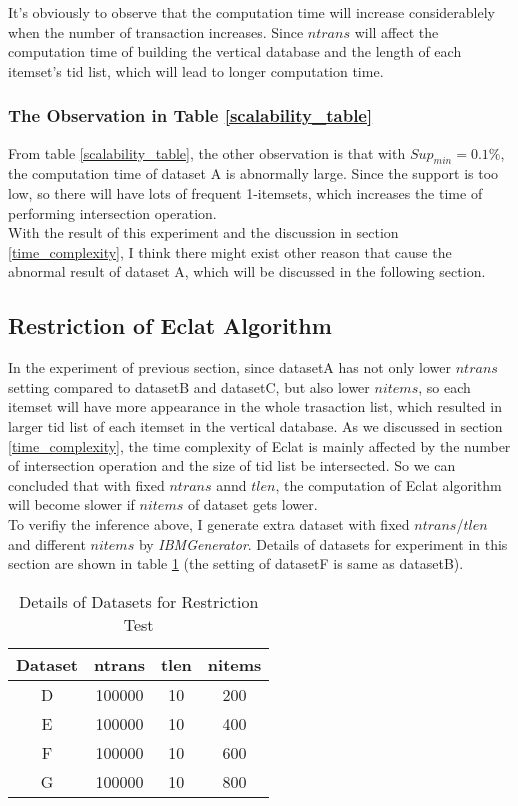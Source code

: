 \documentclass[a4paper, oneside, final, 12pt]{scrartcl} %
\begin{document}
It's obviously to observe that the computation time will increase considerablely
when the number of transaction increases. Since $ntrans$ will affect the computation time
of building the vertical database and the length of each itemset's tid list, which will lead to
longer computation time. \\

\subsubsection{The Observation in Table \ref{scalability_table}}
From table \ref{scalability_table}, the other observation is that with $Sup_{min} = 0.1\%$, 
the computation time of dataset A is abnormally large.
Since the support is too low,
so there will have lots of frequent 1-itemsets, which increases the time of performing
intersection operation. \\
With the result of this experiment and the discussion in section \ref{time_complexity},
I think there might exist other reason that cause the abnormal result of dataset A,
which will be discussed in the following section.

\subsection{Restriction of Eclat Algorithm}

In the experiment of previous section,
since datasetA has not only lower $ntrans$ setting compared to datasetB and datasetC,
but also lower $nitems$, so each itemset will have more appearance in the whole trasaction list,
which resulted in larger tid list of each itemset in the vertical database.
As we discussed in section \ref{time_complexity}, the time complexity of Eclat
is mainly affected by the number of intersection operation and the size of tid list be intersected.
So we can concluded that with fixed $ntrans$ annd $tlen$, the computation of Eclat algorithm
will become slower if $nitems$ of dataset gets lower. \\

To verifiy the inference above,
I generate extra dataset with fixed $ntrans$/$tlen$ and different $nitems$ by \emph{IBMGenerator}.
Details of datasets for experiment in this section are shown in table \ref{dataset_details}
(the setting of datasetF is same as datasetB).

\begin{table}[h]
  \center
    \begin{tabular}{|*{4}{c|}}
      \hline
      Dataset & ntrans & tlen & nitems \\
      \hline
      D & 100000 & 10 & 200 \\ \cline{1-4}
      E & 100000 & 10 & 400 \\ \cline{1-4}
      F & 100000 & 10 & 600 \\ \cline{1-4}
      G & 100000 & 10 & 800 \\ 
      \hline
    \end{tabular}
  \caption{Details of Datasets for Restriction Test}
  \label{dataset_details}
\end{table}
\end{document}
